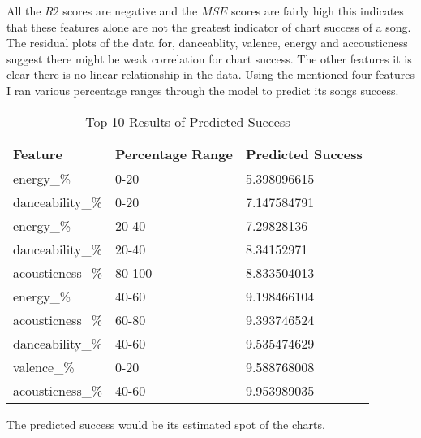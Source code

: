 \documentclass[titlepage]{article}
\begin{document}
\noindent All the $R2$ scores are negative and the $MSE$ scores are fairly high this indicates that these features alone are not the greatest indicator of chart success of a song. The residual plots of the data for, danceablity, valence, energy and accousticness suggest there might be weak correlation for chart success. The other features it is clear there is no linear relationship in the data. Using the mentioned four features I ran various percentage ranges through the model to predict its songs success.   
\begin{table}[H]
    \centering 
    \caption{Top 10 Results of Predicted Success}
    \begin{tabular}{lll}
    \hline
        Feature & Percentage Range & Predicted Success \\ \hline
        energy\_\% & 0-20 & 5.398096615 \\ 
        danceability\_\% & 0-20 & 7.147584791 \\ 
        energy\_\% & 20-40 & 7.29828136 \\ 
        danceability\_\% & 20-40 & 8.34152971 \\ 
        acousticness\_\% & 80-100 & 8.833504013 \\ 
        energy\_\% & 40-60 & 9.198466104 \\ 
        acousticness\_\% & 60-80 & 9.393746524 \\ 
        danceability\_\% & 40-60 & 9.535474629 \\ 
        valence\_\% & 0-20 & 9.588768008 \\ 
        acousticness\_\% & 40-60 & 9.953989035 \\ \hline
    \end{tabular}
\end{table} 
\noindent The predicted success would be its estimated spot of the charts. 
\end{document}
